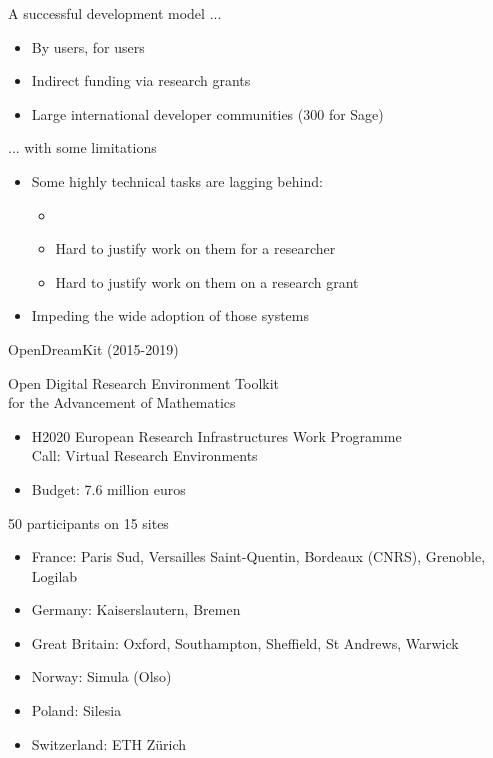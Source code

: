 \documentclass[
  usenames,svgnames, %
  compress,
  ]{beamer}
\begin{document}
\begin{frame}
  \begin{block}{A successful development model ...}
    \begin{itemize}
    \item By users, for users
    \item Indirect funding via research grants
    \item Large international developer communities (300 for Sage)
    \end{itemize}
  \end{block}

  \begin{block}{... with some limitations}
    \begin{itemize}
    \item Some highly technical tasks are lagging behind:
      \begin{itemize}
      \item \item Hard to justify work on them for a researcher
      \item Hard to justify work on them on a research grant
      \end{itemize}
    \item Impeding the wide adoption of those systems
    \end{itemize}
  \end{block}
\end{frame}

\begin{frame}{OpenDreamKit (2015-2019)}
  \begin{block}{Open Digital Research Environment Toolkit\\
    for the Advancement of Mathematics}
    \begin{itemize}
    \item H2020 European Research Infrastructures Work
      Programme\\
 Call: Virtual Research Environments
    \item Budget: 7.6 million euros
    \end{itemize}
  \end{block}

\begin{block}{50 participants on 15 sites}
    \begin{itemize}
    \item France: Paris Sud, Versailles Saint-Quentin, Bordeaux
      (CNRS), Grenoble, Logilab
    \item Germany: Kaiserslautern, Bremen
    \item Great Britain: Oxford, Southampton, Sheffield, St Andrews, Warwick
    \item Norway: Simula (Olso)
    \item Poland: Silesia
    \item Switzerland: ETH Zürich
    \end{itemize}
  \end{block}
\end{frame}
\end{document}
